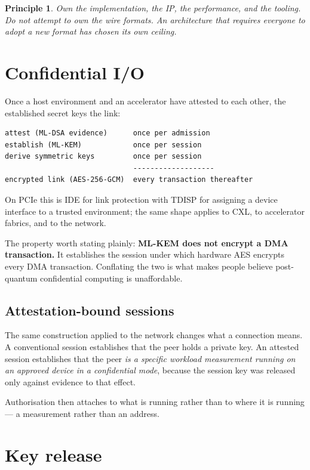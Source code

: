 \documentclass[11pt,a4paper]{article}
\newtheorem{principle}{Principle}
\begin{document}
\begin{principle}
Own the implementation, the IP, the performance, and the tooling. Do not
attempt to own the wire formats. An architecture that requires everyone to
adopt a new format has chosen its own ceiling.
\end{principle}

\section{Confidential I/O}

Once a host environment and an accelerator have attested to each other, the
established secret keys the link:

\begin{lstlisting}
attest (ML-DSA evidence)      once per admission
establish (ML-KEM)            once per session
derive symmetric keys         once per session
                              -------------------
encrypted link (AES-256-GCM)  every transaction thereafter
\end{lstlisting}

On PCIe this is IDE for link protection with TDISP for assigning a device
interface to a trusted environment; the same shape applies to CXL, to
accelerator fabrics, and to the network.

The property worth stating plainly: \textbf{ML-KEM does not encrypt a DMA
transaction.} It establishes the session under which hardware AES encrypts
every DMA transaction. Conflating the two is what makes people believe
post-quantum confidential computing is unaffordable.

\subsection{Attestation-bound sessions}

The same construction applied to the network changes what a connection means.
A conventional session establishes that the peer holds a private key. An
attested session establishes that the peer \emph{is a specific workload
measurement running on an approved device in a confidential mode}, because the
session key was released only against evidence to that effect.

Authorisation then attaches to what is running rather than to where it is
running --- a measurement rather than an address.

\section{Key release}
\end{document}
